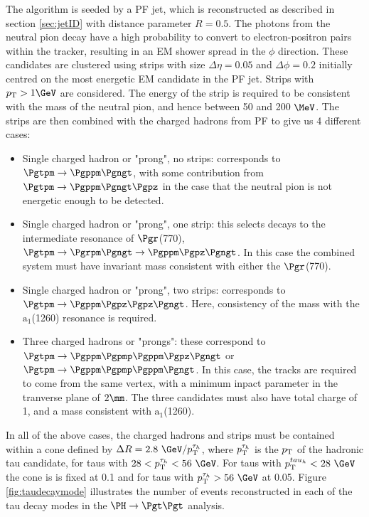 The algorithm is seeded by a \ac{PF} jet, which is reconstructed as described in
section \ref{sec:jetID} with distance parameter $R=0.5$. The photons from the neutral pion decay have a high
probability to convert to electron-positron pairs within the tracker, resulting
in an EM shower spread in the $\phi$ direction. These candidates are clustered
using strips with size $\Delta\eta = 0.05$ and $\Delta\phi = 0.2$ initially
centred on the most energetic EM candidate in the \ac{PF} jet. Strips with
$\pt>1\GeV$ are considered. The energy of the
strip is required to be consistent with the mass of the neutral pion, and hence
between 50 and 200 $\MeV$. The strips are then combined with the charged hadrons
from \ac{PF} to give us 4 different cases:

\begin{itemize}
\item Single charged hadron or "prong", no strips: corresponds to $\Pgtpm\to\Pgppm\Pgngt$,
with some contribution from $\Pgtpm\to\Pgppm\Pgngt\Pgpz$ in the case that the
neutral pion is not energetic enough to be detected.
\item Single charged hadron or "prong", one strip: this selects decays to the intermediate
resonance of $\Pgr$(770), $\Pgtpm\to\Pgrpm\Pgngt\to\Pgppm\Pgpz\Pgngt$. In this
case the combined system must have invariant mass consistent with either the
$\Pgr$(770).
\item Single charged hadron or "prong", two strips: corresponds to
$\Pgtpm\to\Pgppm\Pgpz\Pgpz\Pgngt$. Here, consistency of the mass with the
$\text{a}_{1}$(1260) resonance is required. 
\item Three charged hadrons or "prongs": these correspond to
$\Pgtpm\to\Pgppm\Pgpmp\Pgppm\Pgpz\Pgngt$ or $\Pgtpm\to\Pgppm\Pgpmp\Pgppm\Pgngt$. 
In this case, the tracks are required
to come from the same vertex, with a minimum inpact parameter in the tranverse
plane of $2\mm$. The three candidates must also have total charge of 1, and a
mass consistent with $\text{a}_{1}$(1260). 
\end{itemize}

In all of the above cases, the charged hadrons and strips must be contained
within a cone defined by $\Delta R=2.8~\GeV/\pt^{\tau_{h}}$, where
$p_{\mathrm{T}}^{\tau_{h}}$ is the $p_{\mathrm{T}}$ of the hadronic tau candidate, for taus with $28 <
\pt^{\tau_{h}} < 56~\GeV$. For taus with $\pt^{tau_{h}} < 28~\GeV$ the cone is
is fixed at 0.1 and for taus with $\pt^{\tau_{h}} > 56~\GeV$ at 0.05. 
Figure \ref{fig:taudecaymode} illustrates the number of events reconstructed in
each of the tau decay modes in the $\PH \to \Pgt\Pgt$ analysis.

